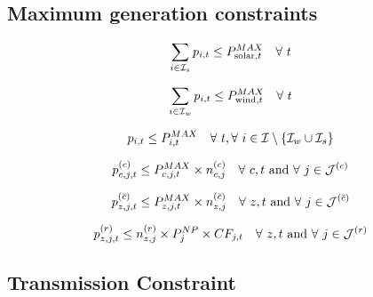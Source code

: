 \documentclass[11pt, oneside]{article}   	%
\newcommand{\bc}{\bar{c}}
\begin{document}
\subsection{Maximum generation constraints}

\begin{equation} \label{eq:ex_solar}
\begin{split}
\sum_{i \in \mathcal{I}_s} p_{i, t} \le P^{MAX}_{\text{solar}, t} \quad \forall~t
\end{split}
\end{equation}

\begin{equation} \label{eq:ex_wind}
\begin{split}
\sum_{i \in \mathcal{I}_w} p_{i, t} \le P^{MAX}_{\text{wind}, t} \quad \forall~t
\end{split}
\end{equation}

\begin{equation} \label{eq:ex_therm}
\begin{split}
p_{i, t} \le P^{MAX}_{i, t} \quad \forall~t, \forall~i \in \mathcal{I} \setminus \{\mathcal{I}_w \cup \mathcal{I}_s \}
\end{split}
\end{equation}

\begin{equation} \label{eq:new_therm}
\begin{split}
p^{(c)}_{c, j, t} \le P^{MAX}_{c, j, t} \times n^{(c)}_{c, j} \quad \forall~c, t  \text{ and }\forall~j\in \mathcal{J}^{(c)}
\end{split}
\end{equation}

\begin{equation} \label{eq:new_therm2}
\begin{split}
p^{(\bc)}_{z, j, t} \le P^{MAX}_{z, j, t} \times n^{(\bc)}_{z, j} \quad \forall~z, t  \text{ and }\forall~j\in \Jc^{(\bc)}
\end{split}
\end{equation}

\begin{equation} \label{eq:new_ren}
\begin{split}
p^{(r)}_{z, j, t} \le n^{(r)}_{z, j}\times P^{NP}_{j} \times CF_{j, t}  \quad \forall~z, t  \text{ and }\forall~j\in \mathcal{J}^{(r)}
\end{split}
\end{equation}

\subsection{Transmission Constraint}
\end{document}
